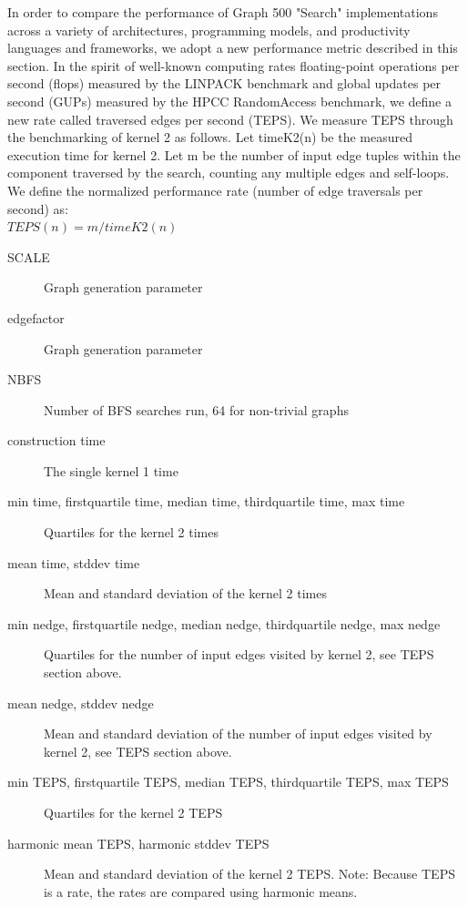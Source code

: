 In order to compare the performance of Graph 500 "Search" implementations across a variety of architectures, programming models, and productivity languages and frameworks, we adopt a new performance metric described in this section. In the spirit of well-known computing rates floating-point operations per second (flops) measured by the LINPACK benchmark and global updates per second (GUPs) measured by the HPCC RandomAccess benchmark, we define a new rate called traversed edges per second (TEPS). We measure TEPS through the benchmarking of kernel 2 as follows. Let timeK2(n) be the measured execution time for kernel 2. Let m be the number of input edge tuples within the component traversed by the search, counting any multiple edges and self-loops. We define the normalized performance rate (number of edge traversals per second) as:
\\
$TEPS(n) = m / timeK2(n)$
\begin{description}
\item[SCALE] Graph generation parameter
\item[edgefactor] Graph generation parameter
\item[NBFS] Number of BFS searches run, 64 for non-trivial graphs
\item[construction time] The single kernel 1 time
\item[min time, firstquartile time, median time, thirdquartile time, max time] Quartiles for the kernel 2 times
\item[mean time, stddev time] Mean and standard deviation of the kernel 2 times
\item[min nedge, firstquartile nedge, median nedge, thirdquartile nedge, max nedge] Quartiles for the number of input edges visited by kernel 2, see TEPS section above.
\item[mean nedge, stddev nedge] Mean and standard deviation of the number of input edges visited by kernel 2, see TEPS section above.
\item[min TEPS, firstquartile TEPS, median TEPS, thirdquartile TEPS, max TEPS]  Quartiles for the kernel 2 TEPS
\item[harmonic mean TEPS, harmonic stddev TEPS] Mean and standard deviation of the kernel 2 TEPS. Note: Because TEPS is a rate, the rates are compared using harmonic means.
\end{description}

